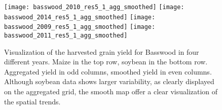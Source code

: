 \begin{figure}[h!]  \centering
  \texttt{[image: basswood\_2010\_res5\_1\_agg\_smoothed]}
  \texttt{[image: basswood\_2014\_res5\_1\_agg\_smoothed]}
  \texttt{[image: basswood\_2009\_res5\_1\_agg\_smoothed]}
  \texttt{[image: basswood\_2011\_res5\_1\_agg\_smoothed]}
  \caption[Visualization of the algorithm output for one field across
  four different years]{Visualization of the harvested grain yield for
    Basswood in four different years. Maize in the top row, soybean in
    the bottom row. Aggregated yield in odd columns, smoothed yield in
    even columns. Although soybean data shows larger variability, as
    clearly displayed on the aggregated grid, the smooth map offer a
    clear visualization of the spatial trends. }
  \label{fig:basswood-history}
\end{figure}

